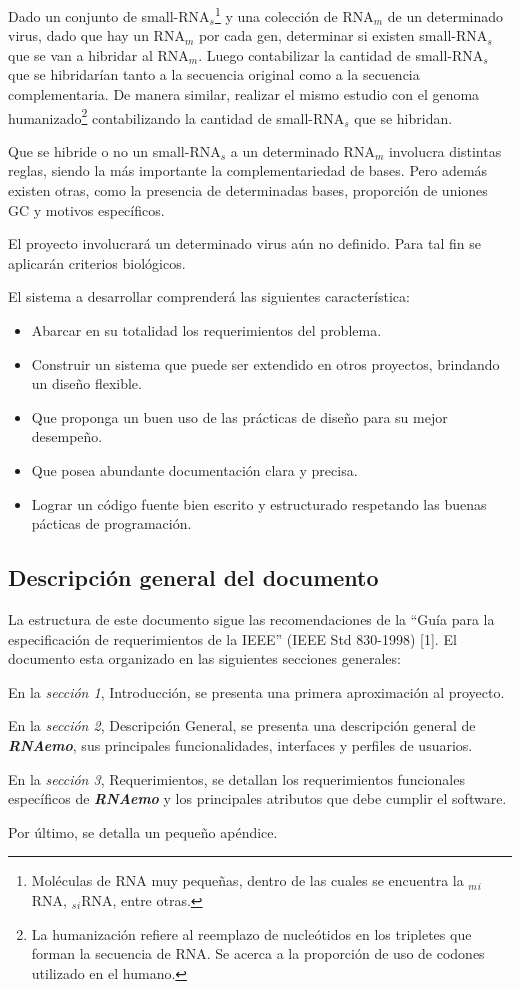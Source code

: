 \documentclass[12pt,a4paper,spanish]{article}
\newcommand{\rnaemo}{\textbf{\emph{RNAemo}}}
\begin{document}
\par Dado un conjunto de small-RNA$_s$\footnote{Moléculas de RNA muy pequeñas, dentro de las cuales se encuentra la $_m$$_i$RNA, $_s$$_i$RNA, entre otras.} y una colección de RNA$_m$ de un determinado virus, dado que hay un RNA$_m$ por cada gen, determinar si existen small-RNA$_s$ que se van a hibridar al RNA$_m$. Luego contabilizar la cantidad de small-RNA$_s$ que se hibridarían tanto a la secuencia original como a la secuencia complementaria. De manera similar, realizar el mismo estudio con el genoma humanizado\footnote{La humanización refiere al reemplazo de nucleótidos en los tripletes que forman la secuencia de RNA. Se acerca a la proporción de uso de codones utilizado en el humano.} contabilizando la cantidad de small-RNA$_s$ que se hibridan. 
\par Que se hibride o no un small-RNA$_s$ a un determinado RNA$_m$ involucra distintas reglas, siendo la más importante la complementariedad de bases. Pero además existen otras, como la presencia de determinadas bases, proporción de uniones GC y motivos específicos.

\par El proyecto involucrará un determinado virus aún no definido. Para tal fin se aplicarán criterios biológicos.

\par El sistema a desarrollar comprenderá las siguientes característica:
\begin{itemize}
	\item Abarcar en su totalidad los requerimientos del problema.
	\item Construir un sistema que puede ser extendido en otros proyectos, brindando un diseño flexible. 
	\item Que proponga un buen uso de las prácticas de diseño para su mejor desempeño.
	\item Que posea abundante documentación clara y precisa.
	\item Lograr un código fuente bien escrito y estructurado respetando las buenas pácticas de programación.
\end{itemize}

\subsection{Descripción general del documento}
\par La estructura de este documento sigue las recomendaciones de la ``Guía para
la especificación de requerimientos de la IEEE'' (IEEE Std 830-1998) [1].
El documento esta organizado en las siguientes secciones generales: 
\par En la \textit{sección 1}, Introducción, se presenta una primera aproximación al proyecto. 
\par En la \textit{sección 2}, Descripción General, se presenta una descripción general de \rnaemo, sus principales
funcionalidades, interfaces y perfiles de usuarios. 
\par En la \textit{sección 3}, Requerimientos, se detallan los requerimientos funcionales específicos de \textbf{\emph{RNAemo}} y
 los principales atributos que debe cumplir el software.
\par Por último, se detalla un pequeño apéndice.
\end{document}
